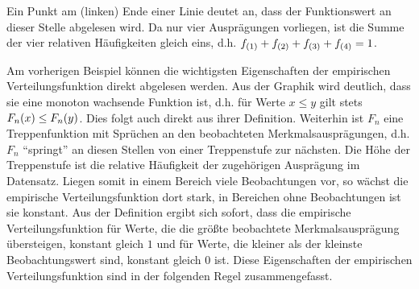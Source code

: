\documentclass{lecture}
\begin{document}
\begin{example}
\begin{center}
        \end{center}
        Ein Punkt am (linken) Ende einer Linie deutet an, dass der Funktionswert an dieser Stelle abgelesen wird.
        Da nur vier Ausprägungen vorliegen, ist die Summe der vier relativen Häufigkeiten gleich eins, d.h. \(f_{\parentheses*{1}} + f_{\parentheses*{2}} + f_{\parentheses*{3}} + f_{\parentheses*{4}} = 1\).
    \end{example}

    Am vorherigen Beispiel können die wichtigsten Eigenschaften der empirischen Verteilungsfunktion direkt abgelesen werden.
    Aus der Graphik wird deutlich, dass sie eine monoton wachsende Funktion ist, d.h. für Werte \(x \le y\) gilt stets \(F_n\parentheses*{x} \le F_n\parentheses*{y}\).
    Dies folgt auch direkt aus ihrer Definition.
    Weiterhin ist \(F_n\) eine Treppenfunktion mit Sprüchen an den beobachteten Merkmalsausprägungen, d.h. \(F_n\) ``springt'' an diesen Stellen von einer Treppenstufe zur nächsten.
    Die Höhe der Treppenstufe ist die relative Häufigkeit der zugehörigen Ausprägung im Datensatz.
    Liegen somit in einem Bereich viele Beobachtungen vor, so wächst die empirische Verteilungsfunktion dort stark, in Bereichen ohne Beobachtungen ist sie konstant.
    Aus der Definition ergibt sich sofort, dass die empirische Verteilungsfunktion für Werte, die die größte beobachtete Merkmalsausprägung übersteigen, konstant gleich \(1\) und für Werte, die kleiner als der kleinste Beobachtungswert sind, konstant gleich \(0\) ist.
    Diese Eigenschaften der empirischen Verteilungsfunktion sind in der folgenden Regel zusammengefasst.
\end{document}
